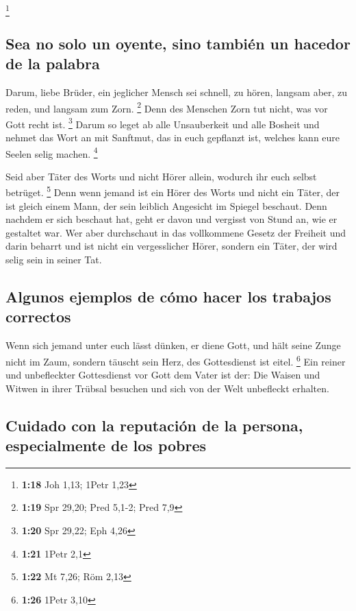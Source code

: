 \footnote{\textbf{1:18} Joh 1,13; 1Petr 1,23}

\hypertarget{sea-no-solo-un-oyente-sino-tambiuxe9n-un-hacedor-de-la-palabra}{%
\subsection{Sea no solo un oyente, sino también un hacedor de la
palabra}\label{sea-no-solo-un-oyente-sino-tambiuxe9n-un-hacedor-de-la-palabra}}

 Darum, liebe Brüder, ein jeglicher Mensch sei schnell,
zu hören, langsam aber, zu reden, und langsam zum Zorn. \footnote{\textbf{1:19}
  Spr 29,20; Pred 5,1-2; Pred 7,9}  Denn des Menschen
Zorn tut nicht, was vor Gott recht ist. \footnote{\textbf{1:20} Spr
  29,22; Eph 4,26}  Darum so leget ab alle Unsauberkeit
und alle Bosheit und nehmet das Wort an mit Sanftmut, das in euch
gepflanzt ist, welches kann eure Seelen selig machen. \footnote{\textbf{1:21}
  1Petr 2,1}

 Seid aber Täter des Worts und nicht Hörer allein,
wodurch ihr euch selbst betrüget. \footnote{\textbf{1:22} Mt 7,26; Röm
  2,13}  Denn wenn jemand ist ein Hörer des Worts und
nicht ein Täter, der ist gleich einem Mann, der sein leiblich Angesicht
im Spiegel beschaut.  Denn nachdem er sich beschaut hat,
geht er davon und vergisst von Stund an, wie er gestaltet war.
 Wer aber durchschaut in das vollkommene Gesetz der
Freiheit und darin beharrt und ist nicht ein vergesslicher Hörer,
sondern ein Täter, der wird selig sein in seiner Tat.

\hypertarget{algunos-ejemplos-de-cuxf3mo-hacer-los-trabajos-correctos}{%
\subsection{Algunos ejemplos de cómo hacer los trabajos
correctos}\label{algunos-ejemplos-de-cuxf3mo-hacer-los-trabajos-correctos}}

 Wenn sich jemand unter euch lässt dünken, er diene Gott,
und hält seine Zunge nicht im Zaum, sondern täuscht sein Herz, des
Gottesdienst ist eitel. \footnote{\textbf{1:26} 1Petr 3,10}
 Ein reiner und unbefleckter Gottesdienst vor Gott dem
Vater ist der: Die Waisen und Witwen in ihrer Trübsal besuchen und sich
von der Welt unbefleckt erhalten.

\hypertarget{cuidado-con-la-reputaciuxf3n-de-la-persona-especialmente-de-los-pobres}{%
\subsection{Cuidado con la reputación de la persona, especialmente de
los
pobres}\label{cuidado-con-la-reputaciuxf3n-de-la-persona-especialmente-de-los-pobres}}

